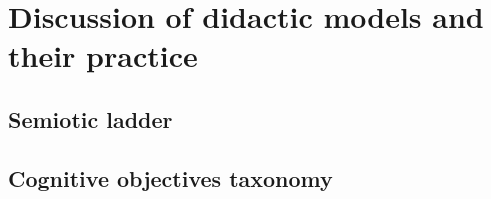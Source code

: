 \chapter{Discussion of didactic models and their practice}

\section{Semiotic ladder}

\section{Cognitive objectives taxonomy}
